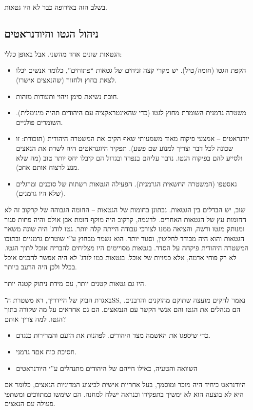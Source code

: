 \documentclass[a4paper]{book}
\begin{document}
	
	בשלב הזה באירופה כבר לא היו גטאות. 
	
	\subsection{ניהול הגטו והיודנראטים}
	הגטאות שונים אחד מהשני. אבל באופן כללי: 
	\begin{itemize}
		\item הקפת הגטו (חומה/טיל). יש מקרי קצה זניחים של גטאות ``פתוחים'', כלומר אנשים יכלו לצאת בחוץ ולחזור (שהנאצים אישרו). 
		\item חובת נשיאת סימן זיהוי ותעודות מזהות. 
		\item משטרה גרמנית השומרת מחוץ לגטו (כדי שהאינטראקציה עם היהודים תהיה מינימלית). השומרים פולניים. 
		\item יודנראטים – אמצעי פיקוח מאוד משמעותי שאף הקים את המשטרה היהודית (תזכורת: זו שכונה לכל דבר וצריך למנוע שם פשע). תפקיד היוגנראטים היה לשרת את הנאצים ולסייע להם בפיקוח הגטו. נדבר עליהם בנפרד ובגדול הם קיבלו יחס יותר טוב (מה שלא מנע לרצוח אותם אחכ). 
		\item גאסטפו (המשטרה החשאית הגרמנית). הפעילה הגטאות רשתות של סוכנים ומרגלים (שלא היו גרמנים). 
	\end{itemize}
	
	שוב, יש הבדלים בין הגטאות. נבתונן בחומות של הגטאות – החומה הגבוהה של קרקוב זה לא החומות עץ של הגטאות האחרים. לדוגמה, קרקוב היה מוקף חומת אבן אולם והיה פחות סגור ומנותק מגטו ורשה, והציאה ממנו לצורכי עבודה הייתה קלה יותר. גטו לודג' היה שונה משאר הגטאות והוא היה מבודד לחלוטין, וסגור יותר. הוא נשמר מבחוץ ע''י שוטרים גרמניים ובתוכו המשטרה היהודית פיקחה על הסדר. בגטאות מסויימים היו מצליחים להבריח אוכל לתוך הגטו. לא רק פוחי אדמה, אלא כמויות של אוכל. בגטאות כמו לודג' לא היה אפשר להכניס אוכל בכלל ולכן היה הרעב ביותר. 
	
	היו גם גטאות קטנים יותר, עם מידת ניתוק קטנה יותר. 
	
	באגרת הבזק של היידריך, רא משטרת ה־SS, נאמר להקים מועצה שתוקם מהזקנים והרבנים. הם מנהלים את הגטו והם אנשי הקשר עם הנמאצים. הם גם אחראים על מה שקורה בתוך הגטו. 
	למה צריך אותם? 
	\begin{itemize}
		\item כדי שיספגו את האשמה מצד היהודים. לפהנות את הזעם והמרירות כנגדם. 
		\item חסיכת כוח אםד גרמני. 
		\item השוואה והטעיה, כאילו חייהם של היהודים מתנהלים ע''י היודנראטים
	\end{itemize}
	
	היודנראט כיחיד היה מוכר ומוסמך, בעל אחריות אישית לביצוע המדיניות הנאצים, כלומר אם היא לא בוצעה הוא לא ימשיך בתפקידו וכנראה ישלח למחנה. הם שימשו כמתווכים ומשתפי פעולה עם הנאצים. 
	
\end{document}
